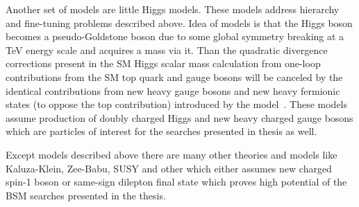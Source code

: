 Another set of models are little Higgs models.
These models address hierarchy and fine-tuning problems described above.
Idea of models is that the Higgs boson becomes a pseudo-Goldstone boson due to some global symmetry breaking at a TeV energy scale and acquires a mass via it.
Than the quadratic divergence corrections present in the SM Higgs scalar mass calculation from one-loop contributions from the SM top quark and gauge bosons will be canceled 
by the identical contributions from new heavy gauge bosons and new heavy fermionic states (to oppose the top contribution) introduced by the model~\cite{Han:2003wu,Brak}.
These models assume production of doubly charged Higgs and new heavy charged gauge bosons which are particles of interest for the searches presented in thesis as well.

Except models described above there are many other theories and models like Kaluza-Klein, Zee-Babu, SUSY and other which either assumes new charged spin-1 boson or same-sign dilepton final state which proves high potential of the BSM searches presented in the thesis.